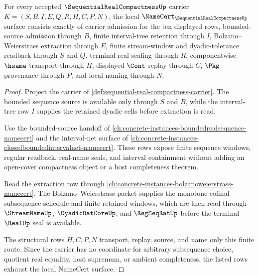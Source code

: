 \begin{theorem}
\label{thm:sequential-real-compactness-namecert-obligations}
For every accepted $\SequentialRealCompactnessUp$ carrier $K=(S,B,I,E,Q,R,H,C,P,N)$, the local $\NameCert_{\SequentialRealCompactnessUp}$ surface consists exactly of carrier admission for the ten displayed rows, bounded-source admission through $B$, finite interval-tree retention through $I$, Bolzano--Weierstrass extraction through $E$, finite stream-window and dyadic-tolerance readback through $S$ and $Q$, terminal real sealing through $R$, componentwise $\hsame$ transport through $H$, displayed $\Cont$ replay through $C$, $\Pkg$ provenance through $P$, and local naming through $N$.
\end{theorem}
\begin{proof}
Project the carrier of \autoref{def:sequential-real-compactness-carrier}. The bounded sequence source is available only through $S$ and $B$, while the interval-tree row $I$ supplies the retained dyadic cells before extraction is read.

Use the bounded-source handoff of \autoref{ch:concrete-instances-boundedrealsequence-namecert} and the interval-net surface of \autoref{ch:concrete-instances-closedboundedintervalnet-namecert}. These rows expose finite sequence windows, regular readback, real-name seals, and interval containment without adding an open-cover compactness object or a host completeness theorem.

Read the extraction row through \autoref{ch:concrete-instances-bolzanoweierstrass-namecert}. The Bolzano--Weierstrass packet supplies the monotone-cofinal subsequence schedule and finite retained windows, which are then read through $\StreamNameUp$, $\DyadicRatCoreUp$, and $\RegSeqRatUp$ before the terminal $\RealUp$ seal is available.

The structural rows $H,C,P,N$ transport, replay, source, and name only this finite route. Since the carrier has no coordinate for arbitrary subsequence choice, quotient real equality, host supremum, or ambient completeness, the listed rows exhaust the local NameCert surface.
\end{proof}

